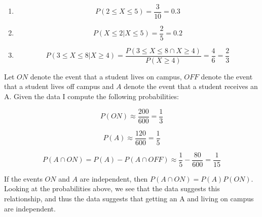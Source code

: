 \begin{problem}{24} $ $
	\begin{enumerate}
		\item 
			\begin{equation*}
				P(2 \le X \le 5) = \frac{3}{10} =0.3
			\end{equation*}
			
		\item 
			\begin{equation*}
				P(X \le 2| X \le 5) = \frac{2}{5} =0.2
			\end{equation*}
		
		\item 
			\begin{equation*}
				P(3 \le X \le 8| X \ge 4) = \frac{P(3 \le X \le 8 \cap X \ge 4)}{P(X \ge 4)} = \frac{4}{6} = \frac{2}{3}
			\end{equation*}		
		
	\end{enumerate}

\end{problem} 


\begin{problem}{25} Let $ON$ denote the event that a student lives on campus, $OFF$ denote the event that a student lives off campus and $A$ denote the event that a student receives an A.  Given the data I compute the following probabilities:

\begin{equation*}
P(ON) \approx \frac{200}{600} =\frac{1}{3}
\end{equation*}

\begin{equation*}
P(A) \approx \frac{120}{600} =\frac{1}{5}
\end{equation*}

\begin{equation*}
P(A \cap ON) = P(A) - P(A \cap OFF) \approx \frac{1}{5} - \frac{80}{600} = \frac{1}{15}
\end{equation*}

If the events $ON$ and $A$ are independent, then $P(A \cap ON)  = P(A)P(ON)$.  Looking at the probabilities above, we see that the data suggests this relationship, and thus the data suggests that getting an A and living on campus are independent. 

\end{problem} 


